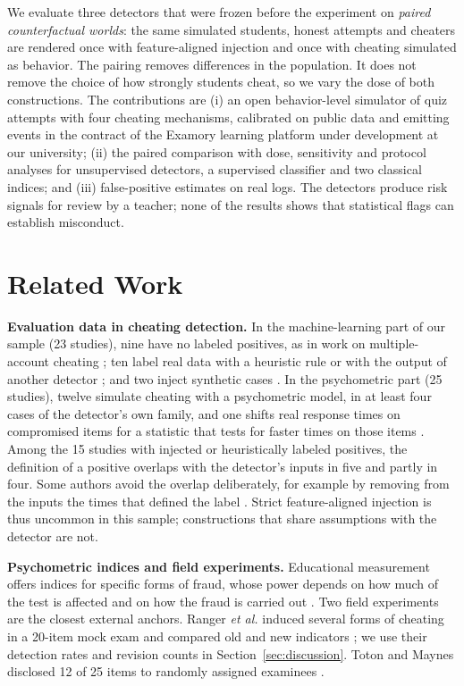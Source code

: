 \documentclass[conference,a4paper]{IEEEtran}
\begin{document}
We evaluate three detectors that were frozen before the experiment on \emph{paired counterfactual worlds}: the same simulated students, honest attempts and cheaters are rendered once with feature-aligned injection and once with cheating simulated as behavior. The pairing removes differences in the population. It does not remove the choice of how strongly students cheat, so we vary the dose of both constructions. The contributions are (i) an open behavior-level simulator of quiz attempts with four cheating mechanisms, calibrated on public data and emitting events in the contract of the Examory learning platform under development at our university; (ii) the paired comparison with dose, sensitivity and protocol analyses for unsupervised detectors, a supervised classifier and two classical indices; and (iii) false-positive estimates on real logs. The detectors produce risk signals for review by a teacher; none of the results shows that statistical flags can establish misconduct.

\section{Related Work}
\textbf{Evaluation data in cheating detection.} In the machine-learning part of our sample (23 studies), nine have no labeled positives, as in work on multiple-account cheating \cite{northcutt2016cameo}; ten label real data with a heuristic rule or with the output of another detector \cite{ruiperez2019multiple,alexandron2024general}; and two inject synthetic cases \cite{kamalov2021cheating,shatnawi2025moodle}. In the psychometric part (25 studies), twelve simulate cheating with a psychometric model, in at least four cases of the detector's own family, and one shifts real response times on compromised items for a statistic that tests for faster times on those items \cite{sinharay2020rt}. Among the 15 studies with injected or heuristically labeled positives, the definition of a positive overlaps with the detector's inputs in five and partly in four. Some authors avoid the overlap deliberately, for example by removing from the inputs the times that defined the label \cite{erdem2025cheating}. Strict feature-aligned injection is thus uncommon in this sample; constructions that share assumptions with the detector are not.

\textbf{Psychometric indices and field experiments.} Educational measurement offers indices for specific forms of fraud, whose power depends on how much of the test is affected and on how the fraud is carried out \cite{cizek2017handbook}. Two field experiments are the closest external anchors. Ranger \emph{et al.} induced several forms of cheating in a 20-item mock exam and compared old and new indicators \cite{ranger2020eexams}; we use their detection rates and revision counts in Section~\ref{sec:discussion}. Toton and Maynes disclosed 12 of 25 items to randomly assigned examinees \cite{toton2019preknowledge}.
\end{document}
